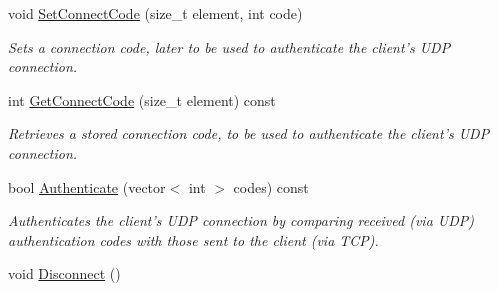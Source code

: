 \begin{DoxyCompactItemize}
void \hyperlink{class_net_server_client_a06ac27a1dd3986da9c1d90a91680a6d0}{SetConnectCode} (size\_\-t element, int code)
\begin{DoxyCompactList}\small\item\em Sets a connection code, later to be used to authenticate the client's UDP connection. \item\end{DoxyCompactList}\item 
int \hyperlink{class_net_server_client_ade7775b0802e69c6d9581a8347c652f7}{GetConnectCode} (size\_\-t element) const 
\begin{DoxyCompactList}\small\item\em Retrieves a stored connection code, to be used to authenticate the client's UDP connection. \item\end{DoxyCompactList}\item 
bool \hyperlink{class_net_server_client_ab161769baaf09d648e3646c82d92ebce}{Authenticate} (vector$<$ int $>$ codes) const 
\begin{DoxyCompactList}\small\item\em Authenticates the client's UDP connection by comparing received (via UDP) authentication codes with those sent to the client (via TCP). \item\end{DoxyCompactList}\item 
\hypertarget{class_net_server_client_a383613334f3431bdf36221a1d123d860}{
void \hyperlink{class_net_server_client_a383613334f3431bdf36221a1d123d860}{Disconnect} ()}
\label{class_net_server_client_a383613334f3431bdf36221a1d123d860}


\end{DoxyCompactItemize}
